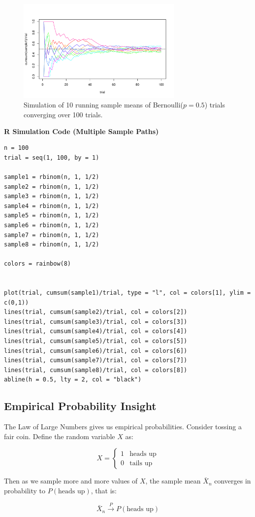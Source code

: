 \begin{figure}[H]
  \centering
  \includegraphics[width=0.72\textwidth]{Section5/simulation_multi.pdf}
  \caption{Simulation of 10 running sample means of Bernoulli(\(p = 0.5\)) trials converging over 100 trials.}
\end{figure}


{\color{gray} \textbf{R Simulation Code (Multiple Sample Paths)}}


\begin{verbatim}
n = 100
trial = seq(1, 100, by = 1)

sample1 = rbinom(n, 1, 1/2)
sample2 = rbinom(n, 1, 1/2)
sample3 = rbinom(n, 1, 1/2)
sample4 = rbinom(n, 1, 1/2)
sample5 = rbinom(n, 1, 1/2)
sample6 = rbinom(n, 1, 1/2)
sample7 = rbinom(n, 1, 1/2)
sample8 = rbinom(n, 1, 1/2)

colors = rainbow(8)


plot(trial, cumsum(sample1)/trial, type = "l", col = colors[1], ylim = c(0,1))
lines(trial, cumsum(sample2)/trial, col = colors[2])
lines(trial, cumsum(sample3)/trial, col = colors[3])
lines(trial, cumsum(sample4)/trial, col = colors[4])
lines(trial, cumsum(sample5)/trial, col = colors[5])
lines(trial, cumsum(sample6)/trial, col = colors[6])
lines(trial, cumsum(sample7)/trial, col = colors[7])
lines(trial, cumsum(sample8)/trial, col = colors[8])
abline(h = 0.5, lty = 2, col = "black")
\end{verbatim}


\subsection*{Empirical Probability Insight}


The Law of Large Numbers gives us empirical probabilities. Consider tossing a fair coin. Define the random variable \( X \) as:

\[
X = \begin{cases}
1 & \text{heads up} \\
0 & \text{tails up}
\end{cases}
\]

Then as we sample more and more values of \( X \), the sample mean \( \bar{X}_n \) converges in probability to \( P(\text{heads up}) \), that is:

\[
\bar{X}_n \xrightarrow{P} P(\text{heads up}) 
\]


